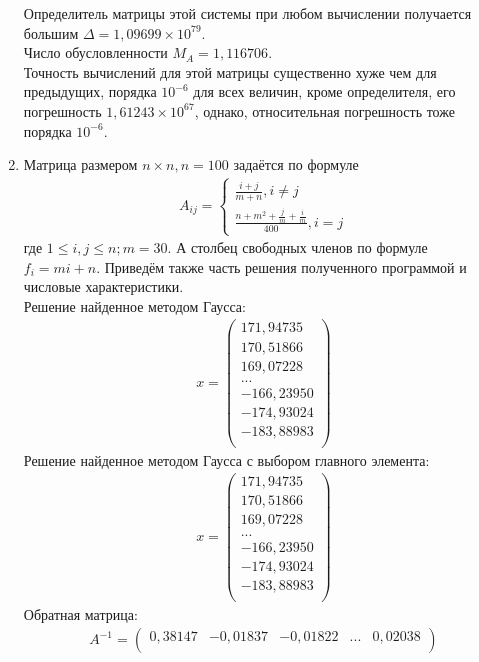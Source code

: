 \documentclass[a4paper,12pt,titlepage,finall]{article}
\begin{document}
\begin{enumerate}
Определитель матрицы этой системы при любом вычислении получается большим $\Delta = 1,09699 \times 10^{79}$.\\
Число обусловленности $M_A = 1,116706$.\\
Точность вычислений для этой матрицы существенно хуже чем для предыдущих, порядка $10^{-6}$ для всех величин, кроме определителя, его погрешность $1,61243 \times 10^{67}$, однако, относительная погрешность тоже порядка $10^{-6}$.
\item
Матрица размером $n \times n, n = 100$ задаётся по формуле
\begin{align}
A_{ij} = \left\{
\begin{array}{ll}
\frac{i+j}{m+n}, i \neq j\\
\frac{n + m^2 + \frac{j}{m} + \frac{i}{m}}{400}, i = j
\end{array}
\right.
\end{align}
где $1 \leq i,j \leq n; m = 30$. А столбец свободных членов по формуле $f_i = mi + n$. Приведём также часть решения полученного программой и числовые характеристики.\\
Решение найденное методом Гаусса:
\begin{align*}
x = \begin{pmatrix}
171,94735 \\
 170,51866 \\
 169,07228 \\
   ...\\
-166,23950 \\
-174,93024 \\
-183,88983 \\
\end{pmatrix}
\end{align*}
Решение найденное методом Гаусса с выбором главного элемента:
\begin{align*}
x = \begin{pmatrix}
171,94735 \\
 170,51866 \\
 169,07228 \\
   ...\\
-166,23950 \\
-174,93024 \\
-183,88983 \\
\end{pmatrix}
\end{align*}
Обратная матрица:
\begin{align*}
A^{-1} = \begin{pmatrix}
    0,38147&    -0,01837&    -0,01822& ... &     0,02038 \\

\end{pmatrix}
\end{align*}
\end{enumerate}
\end{document}
